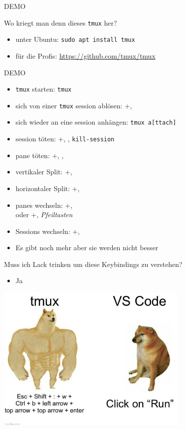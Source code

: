 \documentclass[plain]{beamer}
\newcommand{\prefix}{\Ctrl+\keystroke{b}}
\newcommand{\tmux}{\texttt{tmux}}
\newcommand{\demoslide}{\begin{frame}
  \center \huge DEMO
\end{frame}}
\begin{document}
\demoslide{}

\begin{frame}
  Wo kriegt man denn dieses \tmux{} her?
  \begin{itemize}
    \item unter Ubuntu: \texttt{sudo apt install tmux}
    \item für die Profis: \url{https://github.com/tmux/tmux}
  \end{itemize}
\end{frame}

\demoslide

\begin{frame}
  \begin{itemize}
    \item \tmux{} starten: \texttt{tmux}
    \item sich von einer \tmux{} session ablösen: \prefix, 
    \item sich wieder an eine session anhängen: \texttt{tmux a[ttach]}
    \item session töten: \prefix, \keystroke{:}, \texttt{kill-session}
    \item pane töten: \prefix, , 
    \item vertikaler Split: \prefix, \keystroke{\%}
    \item horizontaler Split: \prefix, 
    \item panes wechseln: \prefix,  \\ oder \prefix, \textit{Pfeiltasten}
    \item Sessions wechseln: \prefix, 
    \item Es gibt noch mehr aber sie werden nicht besser
  \end{itemize}
\end{frame}

\begin{frame}
  Muss ich Lack trinken um diese Keybindings zu verstehen?
  \begin{itemize}
    \item Ja
  \end{itemize}
  \center\includegraphics[width=0.7\textwidth]{imgs/keybinds_meme.jpg}
\end{frame}
\end{document}
